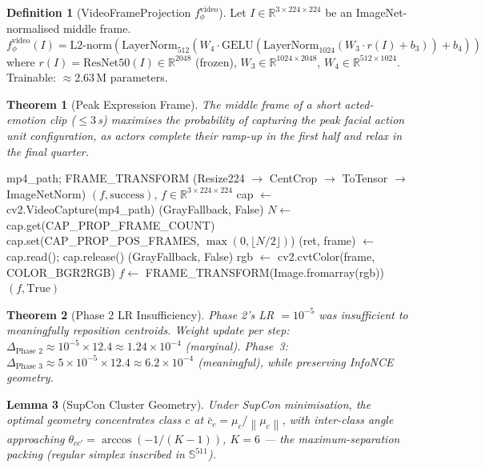 \documentclass[12pt,a4paper]{article}
\theoremstyle{definition}
\newtheorem{definition}{Definition}[section]
\theoremstyle{plain}
\newtheorem{theorem}{Theorem}[section]
\newtheorem{lemma}[theorem]{Lemma}
\theoremstyle{remark}
\newcommand{\R}{\mathbb{R}}
\newcommand{\Sph}{\mathbb{S}}
\newcommand{\Norm}[1]{\left\|#1\right\|}
\newcommand{\LN}{\mathrm{LayerNorm}}
\newcommand{\GELU}{\mathrm{GELU}}
\begin{document}
\begin{definition}[VideoFrameProjection $f_\phi^{\text{video}}$]
Let $I \in \R^{3 \times 224 \times 224}$ be an ImageNet-normalised middle frame.
\[
  f_\phi^{\text{video}}(I) = \text{L2-norm}\!\left(\LN_{512}(W_4 \cdot \GELU(\LN_{1024}(W_3 \cdot r(I) + b_3)) + b_4)\right)
\]
where $r(I) = \text{ResNet50}(I) \in \R^{2048}$ (frozen), $W_3 \in \R^{1024 \times 2048}$, $W_4 \in \R^{512 \times 1024}$. Trainable: $\approx$2.63\,M parameters.
\end{definition}

\begin{theorem}[Peak Expression Frame]
The middle frame of a short acted-emotion clip ($\le 3$\,s) maximises the probability of capturing the peak facial action unit configuration, as actors complete their ramp-up in the first half and relax in the final quarter.
\end{theorem}

\begin{algorithm}[H]
\caption{CREMA-D Middle-Frame Extraction}
\label{alg:frame_extract}
\begin{algorithmic}[1]
\Require mp4\_path; FRAME\_TRANSFORM (Resize224 $\to$ CentCrop $\to$ ToTensor $\to$ ImageNetNorm)
\Ensure $(f, \text{success})$, $f \in \R^{3 \times 224 \times 224}$
\State cap $\gets$ cv2.VideoCapture(mp4\_path)
 \Return (GrayFallback, False) \EndIf
\State $N \gets$ cap.get(CAP\_PROP\_FRAME\_COUNT)
\State cap.set(CAP\_PROP\_POS\_FRAMES, $\max(0, \lfloor N/2 \rfloor)$) 
\State (ret, frame) $\gets$ cap.read(); cap.release()
 \Return (GrayFallback, False) \EndIf
\State rgb $\gets$ cv2.cvtColor(frame, COLOR\_BGR2RGB)
\State $f \gets$ FRAME\_TRANSFORM(Image.fromarray(rgb))
\State \Return $(f, \text{True})$
\end{algorithmic}
\end{algorithm}

\begin{theorem}[Phase 2 LR Insufficiency]
Phase 2's LR $= 10^{-5}$ was insufficient to meaningfully reposition centroids. Weight update per step: $\Delta_{\text{Phase 2}} \approx 10^{-5} \times 12.4 \approx 1.24 \times 10^{-4}$ (marginal). Phase~3: $\Delta_{\text{Phase 3}} \approx 5 \times 10^{-5} \times 12.4 \approx 6.2 \times 10^{-4}$ (meaningful), while preserving InfoNCE geometry.
\end{theorem}

\begin{lemma}[SupCon Cluster Geometry]
Under SupCon minimisation, the optimal geometry concentrates class $c$ at $\bar{c}_c = \mu_c/\Norm{\mu_c}$, with inter-class angle approaching $\theta_{cc'} = \arccos(-1/(K-1))$, $K=6$ --- the maximum-separation packing (regular simplex inscribed in $\Sph^{511}$).
\end{lemma}
\end{document}

